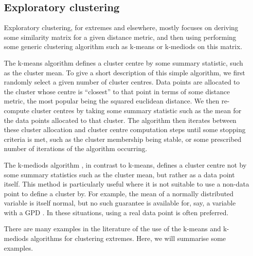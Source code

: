 \documentclass{article}
\numberwithin{equation}{section}
\begin{document}
\subsection{Exploratory clustering}

Exploratory clustering, for extremes and elsewhere, mostly focuses on deriving some similarity matrix for a given distance metric, and then using performing some generic clustering algorithm such as k-means or k-mediods on this matrix.

The k-means algorithm \citep{Macqueen1967} defines a cluster centre by some summary statistic, such as the cluster mean.
To give a short description of this simple algorithm, we first randomly select a given number of cluster centres.
Data points are allocated to the cluster whose centre is ``closest'' to that point in terms of some distance metric, the most popular being the squared euclidean distance.
We then re-compute cluster centres by taking some summary statistic such as the mean for the data points allocated to that cluster.
The algorithm then iterates between these cluster allocation and cluster centre computation steps until some stopping criteria is met, such as the cluster membership being stable, or some prescribed number of iterations of the algorithm occurring.

The k-mediods algorithm \citep{Kaufman1987}, in contrast to k-means, defines a cluster centre not by some summary statistics such as the cluster mean, but rather as a data point itself.
This method is particularly useful where it is not suitable to use a non-data point to define a cluster by. 
For example, the mean of a normally distributed variable is itself normal, but no such guarantee is available for, say, a variable with a GPD \citep{Vignotto2021}.
In these situations, using a real data point is often preferred.

There are many examples in the literature of the use of the k-means and k-mediods algorithms for clustering extremes.
Here, we will summarise some examples.

\end{document}
